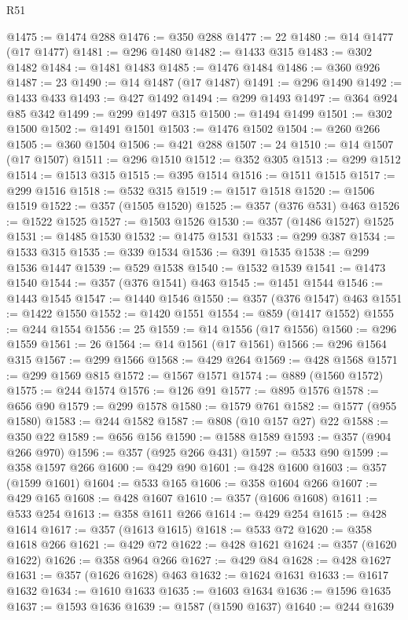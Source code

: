 \begin{lexlean}{R51}
\begin{coremodule}
@1475 := @1474 @288
@1476 := @350 @288
@1477 := 22
@1480 := @14 @1477 (@17 @1477)
@1481 := @296 @1480
@1482 := @1433 @315
@1483 := @302 @1482
@1484 := @1481 @1483
@1485 := @1476 @1484
@1486 := @360 @926
@1487 := 23
@1490 := @14 @1487 (@17 @1487)
@1491 := @296 @1490
@1492 := @1433 @433
@1493 := @427 @1492
@1494 := @299 @1493
@1497 := @364 @924 @85 @342
@1499 := @299 @1497 @315
@1500 := @1494 @1499
@1501 := @302 @1500
@1502 := @1491 @1501
@1503 := @1476 @1502
@1504 := @260 @266
@1505 := @360 @1504
@1506 := @421 @288
@1507 := 24
@1510 := @14 @1507 (@17 @1507)
@1511 := @296 @1510
@1512 := @352 @305
@1513 := @299 @1512
@1514 := @1513 @315
@1515 := @395 @1514
@1516 := @1511 @1515
@1517 := @299 @1516
@1518 := @532 @315
@1519 := @1517 @1518
@1520 := @1506 @1519
@1522 := @357 (@1505 @1520)
@1525 := @357 (@376 @531) @463
@1526 := @1522 @1525
@1527 := @1503 @1526
@1530 := @357 (@1486 @1527) @1525
@1531 := @1485 @1530
@1532 := @1475 @1531
@1533 := @299 @387
@1534 := @1533 @315
@1535 := @339 @1534
@1536 := @391 @1535
@1538 := @299 @1536 @1447
@1539 := @529 @1538
@1540 := @1532 @1539
@1541 := @1473 @1540
@1544 := @357 (@376 @1541) @463
@1545 := @1451 @1544
@1546 := @1443 @1545
@1547 := @1440 @1546
@1550 := @357 (@376 @1547) @463
@1551 := @1422 @1550
@1552 := @1420 @1551
@1554 := @859 (@1417 @1552)
@1555 := @244 @1554
@1556 := 25
@1559 := @14 @1556 (@17 @1556)
@1560 := @296 @1559
@1561 := 26
@1564 := @14 @1561 (@17 @1561)
@1566 := @296 @1564 @315
@1567 := @299 @1566
@1568 := @429 @264
@1569 := @428 @1568
@1571 := @299 @1569 @815
@1572 := @1567 @1571
@1574 := @889 (@1560 @1572)
@1575 := @244 @1574
@1576 := @126 @91
@1577 := @895 @1576
@1578 := @656 @90
@1579 := @299 @1578
@1580 := @1579 @761
@1582 := @1577 (@955 @1580)
@1583 := @244 @1582
@1587 := @808 (@10 @157 @27) @22
@1588 := @350 @22
@1589 := @656 @156
@1590 := @1588 @1589
@1593 := @357 (@904 @266 @970)
@1596 := @357 (@925 @266 @431)
@1597 := @533 @90
@1599 := @358 @1597 @266
@1600 := @429 @90
@1601 := @428 @1600
@1603 := @357 (@1599 @1601)
@1604 := @533 @165
@1606 := @358 @1604 @266
@1607 := @429 @165
@1608 := @428 @1607
@1610 := @357 (@1606 @1608)
@1611 := @533 @254
@1613 := @358 @1611 @266
@1614 := @429 @254
@1615 := @428 @1614
@1617 := @357 (@1613 @1615)
@1618 := @533 @72
@1620 := @358 @1618 @266
@1621 := @429 @72
@1622 := @428 @1621
@1624 := @357 (@1620 @1622)
@1626 := @358 @964 @266
@1627 := @429 @84
@1628 := @428 @1627
@1631 := @357 (@1626 @1628) @463
@1632 := @1624 @1631
@1633 := @1617 @1632
@1634 := @1610 @1633
@1635 := @1603 @1634
@1636 := @1596 @1635
@1637 := @1593 @1636
@1639 := @1587 (@1590 @1637)
@1640 := @244 @1639

\end{coremodule}
\end{lexlean}
